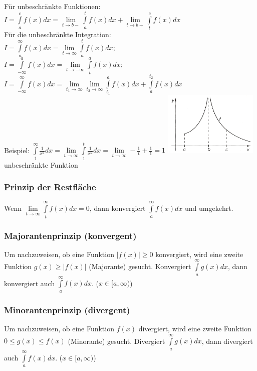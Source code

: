   \begin{multicols}{2}
    F\"ur unbeschr\"ankte Funktionen:\\
    $ I =\int\limits _{a}^{c}f(x)dx=\lim\limits_{t\to
    b-}\int\limits_{a}^{t}f(x)dx+\lim\limits_{t\to b+}\int\limits_{t}^{c}f(x)dx
    $ \\
    F\"ur die unbeschr\"ankte Integration:\\
    $ I =\int\limits _{a} ^{\infty} f(x)dx= \lim \limits_{t\to \infty}\int \limits
    _{a} ^{t}f(x)dx; $ \\
    $ I =\int\limits ^{a} _{-\infty} f(x)dx= \lim \limits_{t\to -\infty}\int
    \limits _{t} ^{a}f(x)dx; $ \\
    $I =\int\limits _{-\infty} ^{\infty} f(x)dx = \lim \limits_{t_1\to \infty} \lim
    \limits
    _{t_2 \to  \infty}\int \limits _{t_1} ^{a}f(x)dx +
    \int\limits_{a}^{t_2}f(x)dx$\\
    Beispiel: $\int\limits_{1}^{\infty}\frac{1}{x^2}dx=\lim\limits_{t\to
    \infty}\int\limits_{1}^{t}\frac{1}{x^2}dx=\lim\limits_{t\to \infty}-\frac{1}{t}+\frac{1}{1}=1$
    \includegraphics[width=4.5cm]{./bilder/unbeschraenkteFunktion.png}\\
    unbeschr\"ankte Funktion
  \end{multicols}
  
  
    
    
\subsubsection{Prinzip der Restfl\"ache}
  Wenn $\lim\limits_{t \rightarrow \infty} \int\limits^{\infty}_{t} f(x) dx = 0$, dann konvergiert
  $\int\limits_a^{\infty} f(x) dx$ und umgekehrt.

\subsubsection{Majorantenprinzip (konvergent)}
  Um nachzuweisen, ob eine Funktion $|f(x)| \geq 0$ konvergiert, wird eine zweite
  Funktion $g(x) \geq |f(x)|$ (Majorante) gesucht. Konvergiert $\int\limits_a^{\infty} g(x) dx$,
  dann konvergiert auch $\int\limits_a^{\infty} f(x) dx$. ($x \in [a, \infty)$)

\subsubsection{Minorantenprinzip (divergent)}
  Um nachzuweisen, ob eine Funktion $f(x)$ divergiert, wird eine zweite
  Funktion $0 \leq g(x) \leq f(x)$ (Minorante) gesucht. Divergiert
  $\int\limits_a^{\infty} g(x) dx$,
  dann divergiert auch $\int\limits_a^{\infty} f(x) dx$. ($x \in [a, \infty)$)
  
